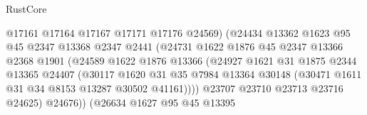 \begin{lexlean}{RustCore}
\begin{coremodule}
                                        @17161
                                        @17164
                                        @17167
                                        @17171
                                        @17176
                                        @24569)
                                      (@24434
                                        @13362
                                        @1623
                                        @95
                                        @45
                                        @2347
                                        @13368
                                        @2347
                                        @2441
                                        (@24731
                                          @1622
                                          @1876
                                          @45
                                          @2347
                                          @13366
                                          @2368
                                          @1901
                                          (@24589
                                            @1622
                                            @1876
                                            @13366
                                            (@24927
                                              @1621
                                              @31
                                              @1875
                                              @2344
                                              @13365
                                              @24407
                                              (@30117
                                                @1620
                                                @31
                                                @35
                                                @7984
                                                @13364
                                                @30148
                                                (@30471 @1611 @31 @34 @8153 @13287 @30502 @41161))))
                                          @23707
                                          @23710
                                          @23713
                                          @23716
                                          @24625)
                                        @24676))
                                    (@26634
                                      @1627
                                      @95
                                      @45
                                      @13395

\end{coremodule}
\end{lexlean}
